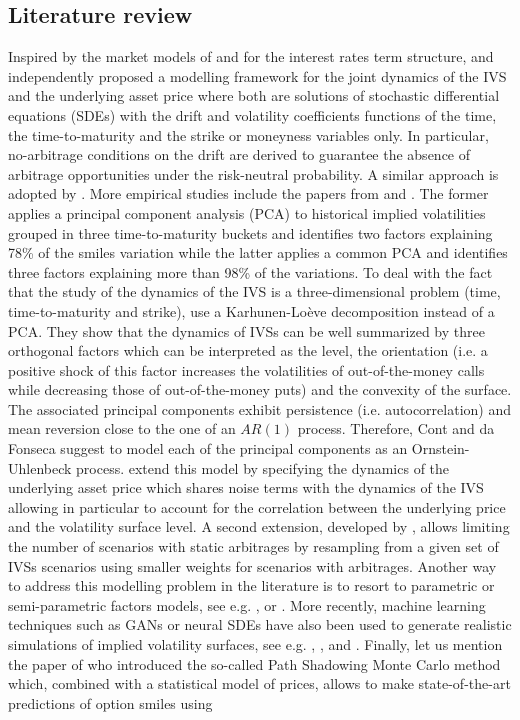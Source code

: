 \subsection{Literature review}
Inspired by the market models of \cite{heath1992bond} and \cite{brace1997market} for the interest rates term structure, \cite{ledoit1998relative} and \cite{schonbucher1999marketmodel} independently proposed a modelling framework for the joint dynamics of the IVS and the underlying asset price where both are solutions of stochastic differential equations (SDEs) with the drift and volatility coefficients functions of the time, the time-to-maturity and the strike or moneyness variables only. In particular, no-arbitrage conditions on the drift are derived to guarantee the absence of arbitrage opportunities under the risk-neutral probability. A similar approach is adopted by \cite{brace2001market}. More empirical studies include the papers from \cite{skiadopoulos2000dynamics} and \cite{fengler2003dynamics}. The former applies a principal component analysis (PCA) to historical implied volatilities grouped in three time-to-maturity buckets and identifies two factors explaining 78\% of the smiles variation while the latter applies a common PCA and identifies three factors explaining more than 98\% of the variations. To deal with the fact that the study of the dynamics of the IVS is a three-dimensional problem (time, time-to-maturity and strike), \cite{cont2002dynamics} use a Karhunen-Loève decomposition instead of a PCA. They show that the dynamics of IVSs can be well summarized by three orthogonal factors which can be interpreted as the level, the orientation (i.e. a positive shock of this factor increases the volatilities of out-of-the-money calls while decreasing those of out-of-the-money puts) and the convexity of the surface. The associated principal components exhibit persistence (i.e. autocorrelation) and mean reversion close to the one of an $AR(1)$ process. Therefore, Cont and da Fonseca suggest to model each of the principal components as an Ornstein-Uhlenbeck process. \cite{cont2002stochastic} extend this model by specifying the dynamics of the underlying asset price which shares noise terms with the dynamics of the IVS allowing in particular to account for the correlation between the underlying price and the volatility surface level. A second extension, developed by \cite{cont2022simulation}, allows limiting the number of scenarios with static arbitrages by resampling from a given set of IVSs scenarios using smaller weights for scenarios with arbitrages. Another way to address this modelling problem in the literature is to resort to parametric or semi-parametric factors models, see e.g. \cite{hafner2005factor}, \cite{fengler2007semiparametric} or \cite{francois2023joint}. More recently, machine learning techniques such as GANs or neural SDEs have also been used to generate realistic simulations of implied volatility surfaces, see e.g. \cite{wiese2019deep}, \cite{cohen2021arbitrage}, \cite{zhang2023} and \cite{choudhary2024}. Finally, let us mention the paper of \cite{morel2024path} who introduced the so-called Path Shadowing Monte Carlo method which, combined with a statistical model of prices, allows to make state-of-the-art predictions of option smiles using 